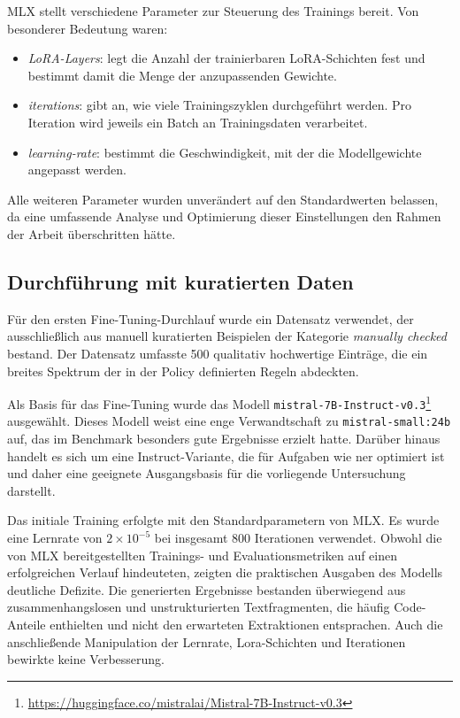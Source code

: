 MLX stellt verschiedene Parameter zur Steuerung des Trainings bereit.
Von besonderer Bedeutung waren:

\begin{itemize}
    \item \textit{LoRA-Layers}: legt die Anzahl der trainierbaren LoRA-Schichten fest und bestimmt damit die Menge der anzupassenden Gewichte.
    \item \textit{iterations}: gibt an, wie viele Trainingszyklen durchgeführt werden. Pro Iteration wird jeweils ein Batch an Trainingsdaten verarbeitet.
    \item \textit{learning-rate}: bestimmt die Geschwindigkeit, mit der die Modellgewichte angepasst werden.
\end{itemize}

Alle weiteren Parameter wurden unverändert auf den Standardwerten belassen, da eine umfassende Analyse und Optimierung dieser Einstellungen den Rahmen der Arbeit überschritten hätte.

\subsection{Durchführung mit kuratierten Daten}

Für den ersten Fine-Tuning-Durchlauf wurde ein Datensatz verwendet, der ausschließlich aus manuell kuratierten Beispielen der Kategorie \textit{manually checked} bestand.
Der Datensatz umfasste 500 qualitativ hochwertige Einträge, die ein breites Spektrum der in der Policy definierten Regeln abdeckten.

Als Basis für das Fine-Tuning wurde das Modell \texttt{mistral-7B-Instruct-v0.3}\footnote{\url{https://huggingface.co/mistralai/Mistral-7B-Instruct-v0.3}} ausgewählt.
Dieses Modell weist eine enge Verwandtschaft zu \texttt{mistral-small:24b} auf, das im Benchmark besonders gute Ergebnisse erzielt hatte.
Darüber hinaus handelt es sich um eine Instruct-Variante, die für Aufgaben wie \gls{ner} optimiert ist und daher eine geeignete Ausgangsbasis für die vorliegende Untersuchung darstellt.

Das initiale Training erfolgte mit den Standardparametern von MLX.
Es wurde eine Lernrate von $2 \times 10^{-5}$ bei insgesamt \num{800} Iterationen verwendet.
Obwohl die von MLX bereitgestellten Trainings- und Evaluationsmetriken auf einen erfolgreichen Verlauf hindeuteten, zeigten die praktischen Ausgaben des Modells deutliche Defizite.
Die generierten Ergebnisse bestanden überwiegend aus zusammenhangslosen und unstrukturierten Textfragmenten, die häufig Code-Anteile enthielten und nicht den erwarteten Extraktionen entsprachen.
Auch die anschließende Manipulation der Lernrate, Lora-Schichten und Iterationen bewirkte keine Verbesserung.

